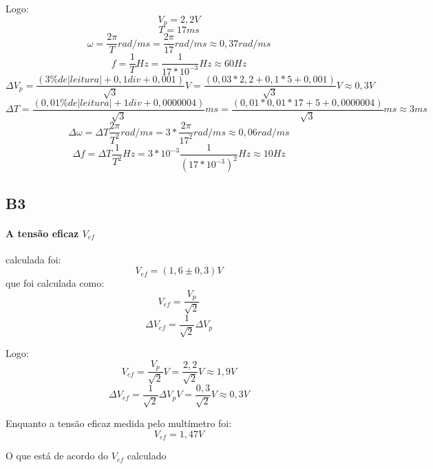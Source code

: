         Logo:
        $$V_p = 2,2 V$$
        $$T = 17 ms$$
        $$\omega = \frac{2\pi}{T} rad/ms = \frac{2\pi}{17} rad/ms \approx 0,37 rad/ms$$
        $$f = \frac{1}{T} Hz = \frac{1}{17*10^{-3}} Hz \approx 60 Hz$$
        \newline  
        $$\Delta V_p = \frac{(3\% de |leitura| + 0,1 div + 0,001)}{\sqrt{3}} V = \frac{(0,03*2,2 + 0,1*5 + 0,001)}{\sqrt{3}} V \approx 0,3 V$$
        $$\Delta T = \frac{(0,01\% de |leitura| + 1 div + 0,0000004)}{\sqrt{3}} ms = \frac{(0,01*0,01*17+5+0,0000004)}{\sqrt{3}} ms \approx 3 ms$$
        $$\Delta \omega = \Delta T\frac{2\pi}{T^2} rad/ms = 3*\frac{2\pi}{17^2} rad/ms \approx 0,06 rad/ms$$
        $$\Delta f = \Delta T\frac{1}{T^2} Hz = 3*10^{-3}\frac{1}{(17*10^{-3})^2} Hz \approx 10 Hz$$

    \subsection{B3}
        \paragraph{A tensão eficaz $V_{ef}$} calculada foi:
        $$V_{ef} = (1,6 \pm 0,3) V$$
        que foi calculada como:
        $$V_{ef} = \frac{V_p}{\sqrt{2}}$$
        $$\Delta V_{ef} = \frac{1}{\sqrt{2}} \Delta V_p$$

        Logo:
        $$V_{ef} = \frac{V_p}{\sqrt{2}} V = \frac{2,2}{\sqrt{2}} V \approx 1,9 V$$
        $$\Delta V_{ef} = \frac{1}{\sqrt{2}} \Delta V_p V = \frac{0,3}{\sqrt{2}} V \approx 0,3 V$$

        Enquanto a tensão eficaz medida pelo multímetro foi:
        $$V_{ef} = 1,47 V$$

        O que está de acordo do $V_{ef}$ calculado

